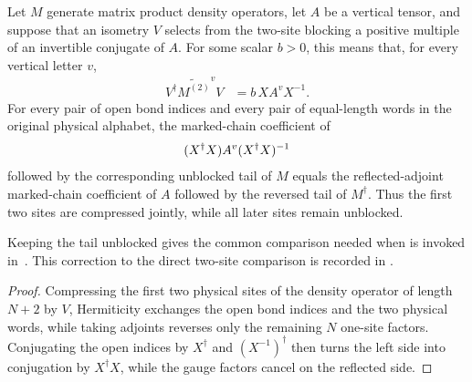 \begin{lemma}
    \label{thm:mpdo_two_site_prefix_gram_reflected_marked_chain}
    \leanok
    Let $M$ generate matrix product density operators, let $A$ be a vertical
    tensor, and suppose that an isometry $V$ selects from the two-site
    blocking a positive multiple of an invertible conjugate of $A$.
    For some scalar $b>0$, this means that, for every vertical letter $v$,
    \begin{align}
        V^\dagger\widetilde{M^{(2)}}^vV
         & =b\,X A^vX^{-1}.
        \label{eq:mpdo_two_site_prefix_gauge_corner}
    \end{align}
    For every pair of open bond indices and every pair of equal-length words
    in the original physical alphabet, the marked-chain coefficient of
    \begin{align}
        (X^\dagger X)A^v(X^\dagger X)^{-1}
        \notag
    \end{align}
    followed by the corresponding unblocked tail of $M$ equals the
    reflected-adjoint marked-chain coefficient of $A$ followed by the
    reversed tail of $M^\dagger$. Thus the first two sites are compressed
    jointly, while all later sites remain unblocked.

    Keeping the tail unblocked gives the common comparison needed when
    \cite[Proposition~4.13, lines~1909--1919]{Cirac2016MPDO_arXiv} is invoked
    in~\cite[Appendix~C.4, lines~2048--2057]{Cirac2016MPDO_arXiv}.
    This correction to the direct two-site comparison is recorded in
    \cite{gap:cpsv16_two_site_sector_unitary_gauge_gap}.
\end{lemma}

\begin{proof}\leanok
    Compressing the first two physical sites of the density operator of length
    $N+2$ by $V$, Hermiticity exchanges the open bond indices and the two
    physical words, while taking adjoints reverses only the remaining $N$
    one-site factors. Conjugating the open indices by $X^\dagger$ and
    $(X^{-1})^\dagger$ then turns the left side into conjugation by
    $X^\dagger X$, while the gauge factors cancel on the reflected side.
\end{proof}

